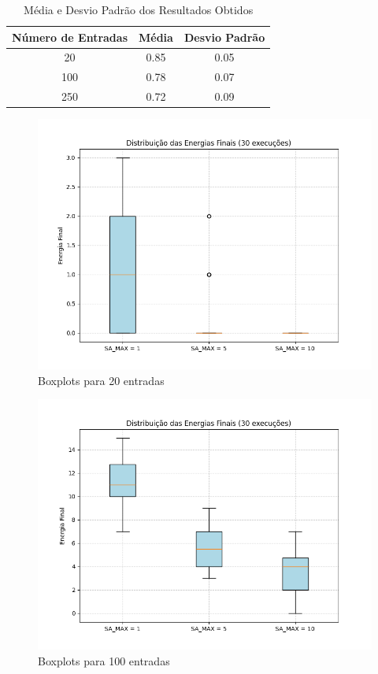 \documentclass[12pt]{article}
\begin{document}
\begin{table}[H]
\centering
\caption{Média e Desvio Padrão dos Resultados Obtidos}
\begin{tabular}{|c|c|c|}
\hline
\textbf{Número de Entradas} & \textbf{Média} & \textbf{Desvio Padrão} \\ \hline
20 & 0.85 & 0.05 \\ \hline
100 & 0.78 & 0.07 \\ \hline
250 & 0.72 & 0.09 \\ \hline
\end{tabular}
\label{tab:resultados}
\end{table}

\begin{figure}[H]
  \centering
  \includegraphics[width=.9\textwidth]{../../boxplot_20.png}
  \caption{Boxplots para 20 entradas}
  \label{fig:metodologia}
  \end{figure}

\begin{figure}[H]
  \centering
  \includegraphics[width=.9\textwidth]{../../boxplot_100.png}
  \caption{Boxplots para 100 entradas}
  \label{fig:metodologia}
   \end{figure}
\end{document}
